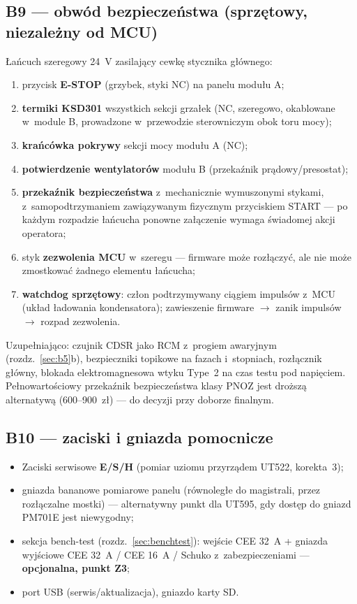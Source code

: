 \documentclass[11pt,a4paper]{article}
\begin{document}
\subsection{B9 --- obwód bezpieczeństwa (sprzętowy, niezależny od MCU)}
\label{sec:b9}

Łańcuch szeregowy 24~V zasilający cewkę stycznika głównego:
\begin{enumerate}
\item przycisk \textbf{E-STOP} (grzybek, styki NC) na panelu modułu A;
\item \textbf{termiki KSD301} wszystkich sekcji grzałek (NC, szeregowo, okablowane w~module B, prowadzone w~przewodzie sterowniczym obok toru mocy);
\item \textbf{krańcówka pokrywy} sekcji mocy modułu A (NC);
\item \textbf{potwierdzenie wentylatorów} modułu B (przekaźnik prądowy/presostat);
\item \textbf{przekaźnik bezpieczeństwa} z~mechanicznie wymuszonymi stykami, z~samopodtrzymaniem zawiązywanym fizycznym przyciskiem START --- po każdym rozpadzie łańcucha ponowne załączenie wymaga świadomej akcji operatora;
\item styk \textbf{zezwolenia MCU} w~szeregu --- firmware może rozłączyć, ale nie może zmostkować żadnego elementu łańcucha;
\item \textbf{watchdog sprzętowy}: człon podtrzymywany ciągiem impulsów z~MCU (układ ładowania kondensatora); zawieszenie firmware $\rightarrow$ zanik impulsów $\rightarrow$ rozpad zezwolenia.
\end{enumerate}
Uzupełniająco: czujnik CDSR jako RCM z~progiem awaryjnym (rozdz.~\ref{sec:b5}b), bezpieczniki topikowe na fazach i~stopniach, rozłącznik główny, blokada elektromagnesowa wtyku Type~2 na czas testu pod napięciem. Pełnowartościowy przekaźnik bezpieczeństwa klasy PNOZ jest droższą alternatywą (600--900~zł) --- do decyzji przy doborze finalnym.

\subsection{B10 --- zaciski i gniazda pomocnicze}

\begin{itemize}
\item Zaciski serwisowe \textbf{E/S/H} (pomiar uziomu przyrządem UT522, korekta~3);
\item gniazda bananowe pomiarowe panelu (równoległe do magistrali, przez rozłączalne mostki) --- alternatywny punkt dla UT595, gdy dostęp do gniazd PM701E jest niewygodny;
\item sekcja bench-test (rozdz.~\ref{sec:benchtest}): wejście CEE 32~A + gniazda wyjściowe CEE 32~A / CEE 16~A / Schuko z~zabezpieczeniami --- \textbf{opcjonalna, punkt Z3};
\item port USB (serwis/aktualizacja), gniazdo karty SD.
\end{itemize}
\end{document}
